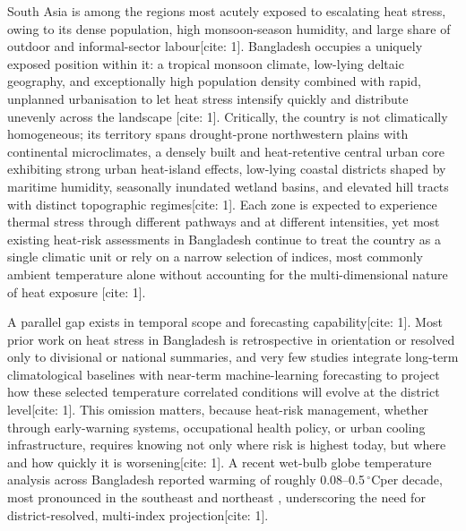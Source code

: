 \documentclass[pdflatex,sn-mathphys-ay]{sn-jnl}
\newcommand{\degC}{\ensuremath{^{\circ}\mathrm{C}}}
\begin{document}
South Asia is among the regions most acutely exposed to escalating heat stress, owing to its dense population, high monsoon-season humidity, and large share of outdoor and informal-sector labour[cite: 1]. Bangladesh occupies a uniquely exposed position within it: a tropical monsoon climate, low-lying deltaic geography, and exceptionally high population density combined with rapid, unplanned urbanisation to let heat stress intensify quickly and distribute unevenly across the landscape \citep{Sultana2021}[cite: 1]. Critically, the country is not climatically homogeneous; its territory spans drought-prone northwestern plains with continental microclimates, a densely built and heat-retentive central urban core exhibiting strong urban heat-island effects, low-lying coastal districts shaped by maritime humidity, seasonally inundated wetland basins, and elevated hill tracts with distinct topographic regimes[cite: 1]. Each zone is expected to experience thermal stress through different pathways and at different intensities, yet most existing heat-risk assessments in Bangladesh continue to treat the country as a single climatic unit or rely on a narrow selection of indices, most commonly ambient temperature alone without accounting for the multi-dimensional nature of heat exposure \citep{Abrar2022}[cite: 1].

A parallel gap exists in temporal scope and forecasting capability[cite: 1]. Most prior work on heat stress in Bangladesh is retrospective in orientation or resolved only to divisional or national summaries, and very few studies integrate long-term climatological baselines with near-term machine-learning forecasting to project how these selected temperature correlated conditions will evolve at the district level[cite: 1]. This omission matters, because heat-risk management, whether through early-warning systems, occupational health policy, or urban cooling infrastructure, requires knowing not only where risk is highest today, but where and how quickly it is worsening[cite: 1]. A recent wet-bulb globe temperature analysis across Bangladesh reported warming of roughly 0.08--0.5\,\degC per decade, most pronounced in the southeast and northeast \citep{kamal2024scientific}, underscoring the need for district-resolved, multi-index projection[cite: 1].
\end{document}
